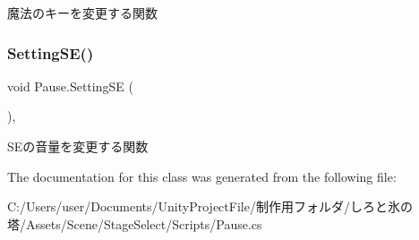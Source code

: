 魔法のキーを変更する関数 

\mbox{\label{class_pause_a169932331432bf421d19a9fafdd6800f}} 
\subsubsection{\texorpdfstring{Setting\+S\+E()}{SettingSE()}}
{\footnotesize\ttfamily void Pause.\+Setting\+SE (\begin{DoxyParamCaption}{ }\end{DoxyParamCaption})\hspace{0.3cm}{\ttfamily [inline]}, {\ttfamily [private]}}



S\+Eの音量を変更する関数 



The documentation for this class was generated from the following file\+:\begin{DoxyCompactItemize}
\item 
C\+:/\+Users/user/\+Documents/\+Unity\+Project\+File/制作用フォルダ/しろと氷の塔/\+Assets/\+Scene/\+Stage\+Select/\+Scripts/Pause.\+cs\end{DoxyCompactItemize}
